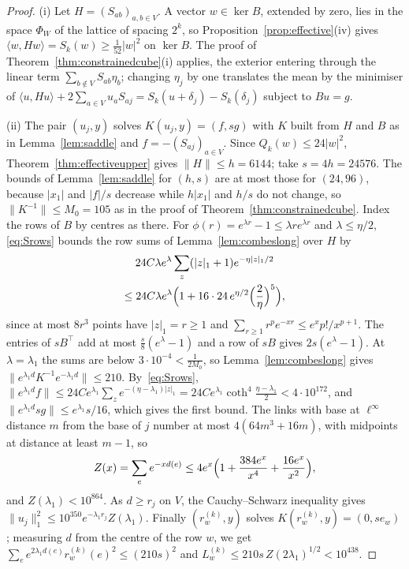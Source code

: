 \documentclass[11pt]{amsart}
\theoremstyle{definition}
\theoremstyle{remark}
\numberwithin{equation}{section}
\begin{document}
\begin{proof}
(i) Let $H=(S_{ab})_{a,b\in V}$. A vector $w\in\ker B$, extended by zero, lies
in the space $\Phi_W$ of the lattice of spacing $2^k$, so
Proposition~\ref{prop:effective}(iv) gives $\langle w,Hw\rangle=S_k(w)\ge
\frac1{52}|w|^2$ on $\ker B$. The proof of
Theorem~\ref{thm:constrainedcube}(i) applies, the exterior entering through
the linear term $\sum_{b\notin V}S_{ab}\eta_b$; changing $\eta_j$ by one
translates the mean by the minimiser of $\langle u,Hu\rangle+2\sum_{a\in V}
u_aS_{aj}=S_k(u+\delta_j)-S_k(\delta_j)$ subject to $Bu=g$.

(ii) The pair $(u_j,y)$ solves $K(u_j,y)=(f,sg)$ with $K$ built from $H$ and
$B$ as in Lemma~\ref{lem:saddle} and $f=-(S_{aj})_{a\in V}$. Since $Q_k(w)\le
24|w|^2$, Theorem~\ref{thm:effectiveupper} gives $\|H\|\le h=6144$; take
$s=4h=24576$. The bounds of Lemma~\ref{lem:saddle} for $(h,s)$ are at most
those for $(24,96)$, because $|x_1|$ and $|f|/s$ decrease while $h|x_1|$ and
$h/s$ do not change, so $\|K^{-1}\|\le M_0=105$ as in the proof of
Theorem~\ref{thm:constrainedcube}. Index the rows of $B$ by centres as there.
For $\phi(r)=e^{\lambda r}-1\le\lambda re^{\lambda r}$ and $\lambda\le\eta/2$,
\eqref{eq:Srows} bounds the row sums of Lemma~\ref{lem:combeslong} over $H$ by
\begin{multline*}
24C\lambda e^\lambda\sum_z(|z|_1+1)e^{-\eta|z|_1/2}\\
\le24C\lambda e^\lambda\Bigl(1+16\cdot24\,e^{\eta/2}\Bigl(\frac2\eta
\Bigr)^5\Bigr),
\end{multline*}
since at most $8r^3$ points have $|z|_1=r\ge1$ and $\sum_{r\ge1}r^pe^{-xr}\le
e^xp!/x^{p+1}$. The entries of $sB^\top$ add at most $\frac s8(e^\lambda-1)$
and a row of $sB$ gives $2s(e^\lambda-1)$. At $\lambda=\lambda_1$ the sums
are below $3\cdot10^{-4}<\frac1{2M_0}$, so
Lemma~\ref{lem:combeslong} gives $\|e^{\lambda_1d}K^{-1}e^{-\lambda_1d}\|\le
210$. By~\eqref{eq:Srows}, $\|e^{\lambda_1d}f\|\le24Ce^{\lambda_1}\sum_z
e^{-(\eta-\lambda_1)|z|_1}=24Ce^{\lambda_1}\coth^4\frac{\eta-\lambda_1}2<
4\cdot10^{172}$, and $\|e^{\lambda_1d}sg\|\le e^{\lambda_1}s/16$, which gives the
first bound. The links with base at $\ell^\infty$ distance $m$ from the base
of $j$ number at most $4(64m^3+16m)$, with midpoints at distance at least
$m-1$, so
\[
Z(x)=\sum_ee^{-xd(e)}\le4e^x\Bigl(1+\frac{384e^x}{x^4}+\frac{16e^x}{x^2}
\Bigr),
\]
and $Z(\lambda_1)<10^{864}$.
As $d\ge r_j$ on $V$, the Cauchy--Schwarz inequality gives $\|u_j\|_1^2\le
10^{350}e^{-\lambda_1r_j}Z(\lambda_1)$. Finally $(r^{(k)}_w,y)$ solves
$K(r^{(k)}_w,y)=(0,se_w)$; measuring $d$ from the centre of the row $w$,
we get $\sum_ee^{2\lambda_1d(e)}r^{(k)}_w(e)^2\le(210s)^2$ and $L^{(k)}_w\le210s\,
Z(2\lambda_1)^{1/2}<10^{438}$.


\end{proof}
\end{document}
